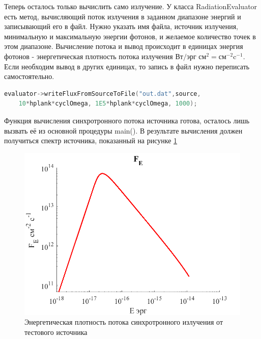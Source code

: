 Теперь осталось только вычислить само излучение. У класса RadiationEvaluator есть метод, вычисляющий поток излучения в заданном диапазоне энергий и записывающий его в файл. Нужно указать имя файла, источник излучения, минимальную и максимальную энергии фотонов, и желаемое количество точек в этом диапазоне. Вычисление потока и вывод происходит в единицах энергия фотонов - энергетическая плотность потока излучения $\text{Вт}/ \text{эрг } {\text{см}}^2 = {\text{см}}^{-2} {\text{c}}^{-1}$. Если необходим вывод в других единицах, то запись в файл нужно переписать самостоятельно. 

\begin{lstlisting}[language=c++]
	evaluator->writeFluxFromSourceToFile("out.dat",source, 
	10*hplank*cyclOmega, 1E5*hplank*cyclOmega, 1000);
\end{lstlisting}


Функция вычисления синхротронного потока источника готова, осталось лишь вызвать её из основной процедуры main(). В результате вычисления должен получиться спектр источника, показанный на рисунке \ref{example0}
\begin{figure}
	\centering
	\includegraphics[width=12.5 cm]{./fig/example0.png} 
	\caption{Энергетическая плотность потока синхротронного излучения от тестового источника}
	\label{example0}
\end{figure}